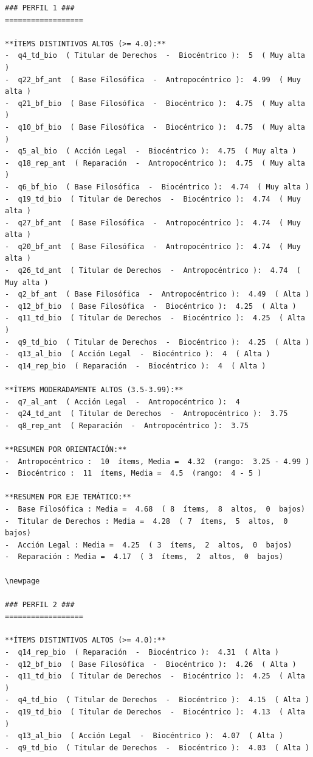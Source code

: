 \documentclass[
  11pt,
  letterpaper,
  DIV=11,
  numbers=noendperiod]{scrartcl}
\begin{document}
\begin{verbatim}
### PERFIL 1 ###
==================

**ÍTEMS DISTINTIVOS ALTOS (>= 4.0):**
-  q4_td_bio  ( Titular de Derechos  -  Biocéntrico ):  5  ( Muy alta )
-  q22_bf_ant  ( Base Filosófica  -  Antropocéntrico ):  4.99  ( Muy alta )
-  q21_bf_bio  ( Base Filosófica  -  Biocéntrico ):  4.75  ( Muy alta )
-  q10_bf_bio  ( Base Filosófica  -  Biocéntrico ):  4.75  ( Muy alta )
-  q5_al_bio  ( Acción Legal  -  Biocéntrico ):  4.75  ( Muy alta )
-  q18_rep_ant  ( Reparación  -  Antropocéntrico ):  4.75  ( Muy alta )
-  q6_bf_bio  ( Base Filosófica  -  Biocéntrico ):  4.74  ( Muy alta )
-  q19_td_bio  ( Titular de Derechos  -  Biocéntrico ):  4.74  ( Muy alta )
-  q27_bf_ant  ( Base Filosófica  -  Antropocéntrico ):  4.74  ( Muy alta )
-  q20_bf_ant  ( Base Filosófica  -  Antropocéntrico ):  4.74  ( Muy alta )
-  q26_td_ant  ( Titular de Derechos  -  Antropocéntrico ):  4.74  ( Muy alta )
-  q2_bf_ant  ( Base Filosófica  -  Antropocéntrico ):  4.49  ( Alta )
-  q12_bf_bio  ( Base Filosófica  -  Biocéntrico ):  4.25  ( Alta )
-  q11_td_bio  ( Titular de Derechos  -  Biocéntrico ):  4.25  ( Alta )
-  q9_td_bio  ( Titular de Derechos  -  Biocéntrico ):  4.25  ( Alta )
-  q13_al_bio  ( Acción Legal  -  Biocéntrico ):  4  ( Alta )
-  q14_rep_bio  ( Reparación  -  Biocéntrico ):  4  ( Alta )

**ÍTEMS MODERADAMENTE ALTOS (3.5-3.99):**
-  q7_al_ant  ( Acción Legal  -  Antropocéntrico ):  4 
-  q24_td_ant  ( Titular de Derechos  -  Antropocéntrico ):  3.75 
-  q8_rep_ant  ( Reparación  -  Antropocéntrico ):  3.75 

**RESUMEN POR ORIENTACIÓN:**
-  Antropocéntrico :  10  ítems, Media =  4.32  (rango:  3.25 - 4.99 )
-  Biocéntrico :  11  ítems, Media =  4.5  (rango:  4 - 5 )

**RESUMEN POR EJE TEMÁTICO:**
-  Base Filosófica : Media =  4.68  ( 8  ítems,  8  altos,  0  bajos)
-  Titular de Derechos : Media =  4.28  ( 7  ítems,  5  altos,  0  bajos)
-  Acción Legal : Media =  4.25  ( 3  ítems,  2  altos,  0  bajos)
-  Reparación : Media =  4.17  ( 3  ítems,  2  altos,  0  bajos)

\newpage

### PERFIL 2 ###
==================

**ÍTEMS DISTINTIVOS ALTOS (>= 4.0):**
-  q14_rep_bio  ( Reparación  -  Biocéntrico ):  4.31  ( Alta )
-  q12_bf_bio  ( Base Filosófica  -  Biocéntrico ):  4.26  ( Alta )
-  q11_td_bio  ( Titular de Derechos  -  Biocéntrico ):  4.25  ( Alta )
-  q4_td_bio  ( Titular de Derechos  -  Biocéntrico ):  4.15  ( Alta )
-  q19_td_bio  ( Titular de Derechos  -  Biocéntrico ):  4.13  ( Alta )
-  q13_al_bio  ( Acción Legal  -  Biocéntrico ):  4.07  ( Alta )
-  q9_td_bio  ( Titular de Derechos  -  Biocéntrico ):  4.03  ( Alta )


\end{verbatim}
\end{document}
